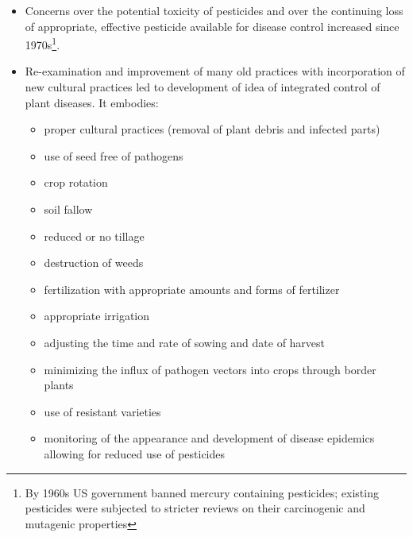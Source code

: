 \documentclass[11pt,dvipsnames,ignorenonframetext,aspectratio=169]{beamer}
\providecommand{\tightlist}{%
  \setlength{\itemsep}{0pt}\setlength{\parskip}{0pt}}
\begin{document}
\begin{frame}{}
\protect\hypertarget{section-10}{}
\small

\begin{itemize}
\tightlist
\item
  Concerns over the potential toxicity of pesticides and over the
  continuing loss of appropriate, effective pesticide available for
  disease control increased since
  1970s\footnote[frame]{\scriptsize By 1960s US government banned mercury containing pesticides; existing pesticides were subjected to stricter reviews on their carcinogenic and mutagenic properties}.
\item
  Re-examination and improvement of many old practices with
  incorporation of new cultural practices led to development of idea of
  integrated control of plant diseases. It embodies:

  \begin{multicols}{2}
  \begin{itemize}
  \footnotesize
  \item proper cultural practices (removal of plant debris and infected parts)
  \item use of seed free of pathogens
  \item crop rotation
  \item soil fallow
  \item reduced or no tillage
  \item destruction of weeds
  \item fertilization with appropriate amounts and forms of fertilizer
  \item appropriate irrigation
  \item adjusting the time and rate of sowing and date of harvest
  \item minimizing the influx of pathogen vectors into crops through border plants
  \item use of resistant varieties
  \item monitoring of the appearance and development of disease epidemics allowing for reduced use of pesticides
  \end{itemize}
  \end{multicols}
\end{itemize}
\end{frame}
\end{document}
